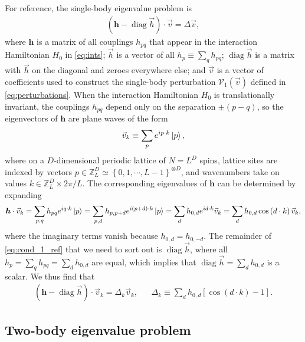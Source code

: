 \documentclass[nofootinbib,notitlepage,11pt]{revtex4-2}
\newcommand{\p}[1]{\left(#1\right)} %
\renewcommand{\sp}[1]{\left[#1\right]} %
\renewcommand{\set}[1]{\left\{#1\right\}} %
\renewcommand{\c}{\cdot} %
\newcommand{\m}{\bm} %
\renewcommand{\v}{\vec} %
\newcommand{\1}{\mathds{1}}
\newcommand{\V}{\mathcal{V}}
\newcommand{\ZZ}{\mathbb{Z}}
\DeclareMathOperator{\diag}{diag}
\begin{document}
For reference, the single-body eigenvalue problem is
\begin{align}
  \p{\m h - \diag\v h}\c\v v = \Delta \v v,
  \label{eq:cond_1_ref}
\end{align}
where $\m h$ is a matrix of all couplings $h_{pq}$ that appear in the
interaction Hamiltonian $H_0$ in \eqref{eq:ints}; $\v h$ is a vector
of all $h_p\equiv\sum_q h_{pq}$; $\diag\v h$ is a matrix with $\v h$
on the diagonal and zeroes everywhere else; and $\v v$ is a vector of
coefficients used to construct the single-body perturbation
$\V_1\p{\v v}$ defined in \eqref{eq:perturbations}.  When the
interaction Hamiltonian $H_0$ is translationally invariant, the
couplings $h_{pq}$ depend only on the separation $\pm\p{p-q}$, so the
eigenvectors of $\m h$ are plane waves of the form
\begin{align}
  \v v_k \equiv \sum_p e^{ip\c k} \ket{p},
\end{align}
where on a $D$-dimensional periodic lattice of $N=L^D$ spins, lattice
sites are indexed by vectors
$p\in\ZZ_L^D\simeq\set{0,1,\cdots,L-1}^{\otimes D}$, and wavenumbers
take on values $k\in\ZZ_L^D\times2\pi/L$.  The corresponding
eigenvalues of $\m h$ can be determined by expanding
\begin{align}
  \m h\c\v v_k = \sum_{p,q} h_{pq} e^{iq\c k} \ket{p}
  = \sum_{p,d} h_{p,p+d} e^{i\p{p+d}\c k} \ket{p}
  = \sum_d h_{0,d} e^{id\c k} \v v_k
  = \sum_d h_{0,d} \cos\p{d\c k} \v v_k,
\end{align}
where the imaginary terms vanish because $h_{0,d}=h_{0,-d}$.  The
remainder of \eqref{eq:cond_1_ref} that we need to sort out is
$\diag\v h$, where all $h_p=\sum_qh_{pq}=\sum_dh_{0,d}$ are equal,
which implies that $\diag\v h=\sum_dh_{0,d}$ is a scalar.  We thus
find that
\begin{align}
  \p{\m h - \diag\v h}\c\v v_k = \Delta_k \v v_k,
  &&
  \Delta_k \equiv \sum_d h_{0,d} \sp{\cos\p{d\c k}-1}.
\end{align}

\subsection{Two-body eigenvalue problem}
\label{sec:trans_inv_two}
\end{document}

